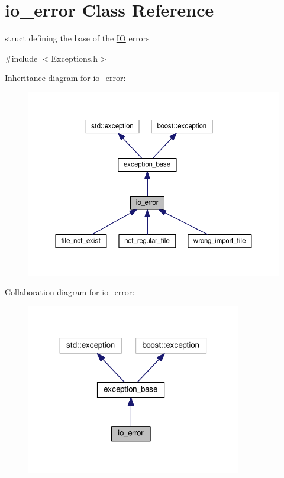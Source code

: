 \hypertarget{structio__error}{\section{io\+\_\+error Class Reference}
\label{structio__error}
}


struct defining the base of the \hyperlink{classIO}{I\+O} errors  




{\ttfamily \#include $<$Exceptions.\+h$>$}



Inheritance diagram for io\+\_\+error\+:\nopagebreak
\begin{figure}[H]
\begin{center}
\leavevmode
\includegraphics[width=350pt]{structio__error__inherit__graph}
\end{center}
\end{figure}


Collaboration diagram for io\+\_\+error\+:\nopagebreak
\begin{figure}[H]
\begin{center}
\leavevmode
\includegraphics[width=266pt]{structio__error__coll__graph}
\end{center}
\end{figure}


